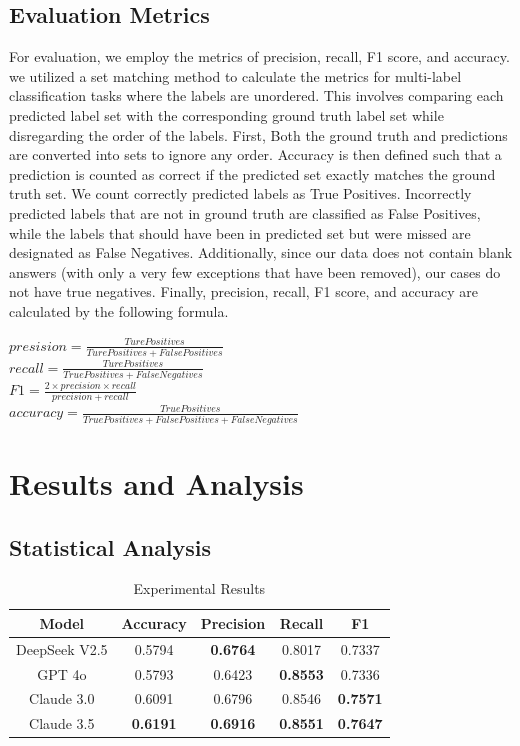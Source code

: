 \documentclass[a4paper]{article}
\begin{document}
\subsection{Evaluation Metrics}
For evaluation, we employ the metrics of precision, recall, F1 score, and accuracy. we utilized a set matching method to calculate the metrics 
for multi-label classification tasks where the labels are unordered. 
This involves comparing each predicted label set with the corresponding ground truth label set while disregarding the order of the labels. 
First, Both the ground truth and predictions are converted into sets to ignore any order. Accuracy is then defined such that a prediction is 
counted as correct if the predicted set exactly matches the ground truth set. We count correctly predicted labels as True Positives. 
Incorrectly predicted labels that are not in ground truth are classified as False Positives, while the labels that should have been in predicted set 
but were missed are designated as False Negatives. Additionally, since our data does not contain blank answers (with only a very few exceptions that have been removed), 
our cases do not have true negatives. Finally, precision, recall, F1 score, and accuracy are calculated by the following formula.
\begin{center}
$presision=\frac{Ture Positives}{Ture Positives + False Positives}$\\ [0.3 cm]
$recall=\frac{Ture Positives}{True Positives + False Negatives}$\\ [0.3 cm]
$F1=\frac{2 \times precision \times recall}{precision + recall}$\\ [0.3 cm]
$accuracy=\frac{True Positives}{True Positives + False Positives + False Negatives}$
\end{center}

\section{Results and Analysis}
\subsection{Statistical Analysis}

\begin{table}[h]
  \begin{center}
    \begin{tabular}{|c|c|c|c|c|}
    \hline
    \textbf{Model} & \textbf{Accuracy} & \textbf{Precision} & \textbf{Recall} & \textbf{F1} \\ \hline
    DeepSeek V2.5 & 0.5794 & \textbf{0.6764} & 0.8017 & 0.7337 \\ 
    GPT 4o & 0.5793 & 0.6423 & \textbf{0.8553} & 0.7336 \\
    Claude 3.0 & 0.6091	& 0.6796 & 0.8546 & \textbf{0.7571} \\
    Claude 3.5 & \textbf{0.6191} & \textbf{0.6916} & \textbf{0.8551} & \textbf{0.7647} \\ \hline
    \end{tabular}
  \end{center}
  \caption{Experimental Results}
\end{table}
    
\end{document}
